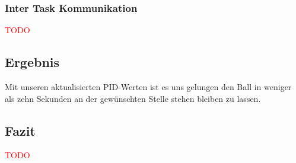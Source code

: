 \subsubsection{Inter Task Kommunikation}
\textcolor{red}{TODO}

\subsection{Ergebnis}
Mit unseren aktualisierten PID-Werten ist es uns gelungen den Ball in weniger als zehn Sekunden an der gewünschten Stelle stehen bleiben zu lassen.\\

\subsection{Fazit}
\textcolor{red}{TODO}